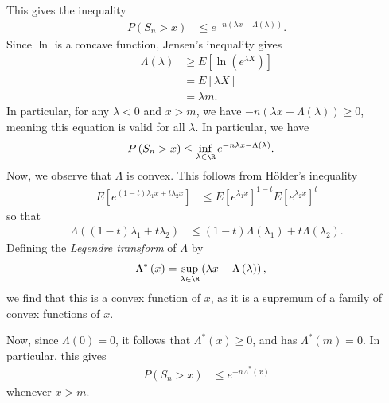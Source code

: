 \documentclass[10pt]{mypackage}
\begin{document}
This gives the inequality
\begin{align*}
  P\left( S_n > x \right) &\leq e^{-n\left( \lambda x - \Lambda\left( \lambda \right) \right)}.
\end{align*}
Since $\ln$ is a concave function, Jensen's inequality gives
\begin{align*}
  \Lambda\left( \lambda \right) &\geq E\left[ \ln\left( e^{\lambda X} \right) \right]\\
                                &= E\left[ \lambda X \right]\\
                                &= \lambda m.
\end{align*}
In particular, for any $\lambda < 0$ and $x > m$, we have $-n\left( \lambda x - \Lambda\left( \lambda \right) \right) \geq 0$, meaning this equation is valid for all $\lambda$. In particular, we have
\begin{align*}
  P\left( S_n > x \right) &\leq \inf_{\lambda\in \R} e^{-n\lambda x - \Lambda\left( \lambda \right)}.
\end{align*}
Now, we observe that $\Lambda$ is convex. This follows from Hölder's inequality
\begin{align*}
  E\left[ e^{\left( 1-t \right)\lambda_1 x + t\lambda_2 x} \right] &\leq E\left[ e^{\lambda_1 x} \right]^{1-t}E\left[ e^{\lambda_2 x} \right]^{t}
\end{align*}
so that
\begin{align*}
  \Lambda\left( \left( 1-t \right)\lambda_1 + t\lambda_2 \right) &\leq \left( 1-t \right)\Lambda\left( \lambda_1 \right) + t\Lambda\left( \lambda_2 \right).
\end{align*}
Defining the \textit{Legendre transform} of $\Lambda$ by
\begin{align*}
  \Lambda^{\ast}\left( x \right) &= \sup_{\lambda\in \R} \left( \lambda x - \Lambda\left( \lambda \right) \right),
\end{align*}
we find that this is a convex function of $x$, as it is a supremum of a family of convex functions of $x$.

Now, since $\Lambda(0) = 0$, it follows that $\Lambda^{\ast}(x)\geq 0$, and has $\Lambda^{\ast}\left( m \right) = 0$. In particular, this gives
\begin{align*}
  P\left( S_n > x \right) &\leq e^{-n\Lambda^{\ast}\left( x \right)}
\end{align*}
whenever $x > m$.
\end{document}
